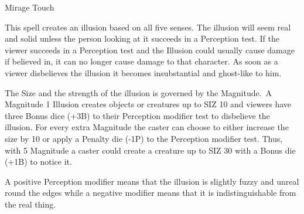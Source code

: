 \begin{rpg-spell}
{Mirage}
{Touch}

This spell creates an illusion based on all five senses. The illusion will seem real and solid unless the person looking at it succeeds in a Perception test. If the viewer succeeds in a Perception test and the Illusion could usually cause damage if believed in, it can no longer cause damage to that character. As soon as a viewer disbelieves the illusion it becomes insubstantial and ghost-like to him.

The Size and the strength of the illusion is governed by the Magnitude. A Magnitude 1 Illusion creates objects or creatures up to SIZ 10 and viewers have three Bonus dice (+3B) to their Perception modifier test to disbelieve the illusion. For every extra Magnitude the caster can choose to either increase the size by 10 or apply a Penalty die (-1P) to the Perception modifier test. Thus, with 5 Magnitude a caster could create a creature up to SIZ 30 with a Bonus die (+1B) to notice it.
	
A positive Perception modifier means that the illusion is slightly fuzzy and unreal round the edges while a negative modifier means that it is indistinguishable from the real thing.
\end{rpg-spell}


